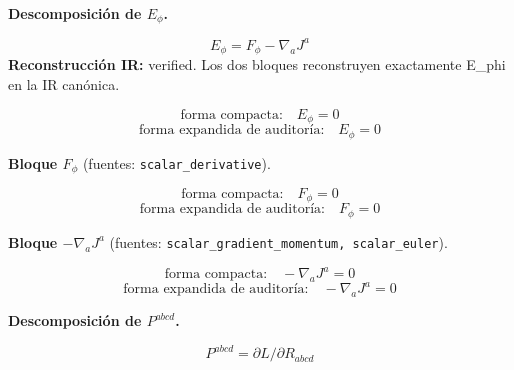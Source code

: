 \documentclass[11pt]{article}
\begin{document}
\par\medskip\noindent\textbf{Descomposición de $ E_{\phi} $.}\par
\begin{dmath*}[breakdepth={5}]
E_{\phi}=F_{\phi}-\nabla_aJ^a
\end{dmath*}
\textbf{Reconstrucción IR:} verified. Los dos bloques reconstruyen exactamente E\_phi en la IR canónica.\par
\begin{dmath*}[breakdepth={5}]
\text{forma compacta:}\quad E_{\phi} = 0
\end{dmath*}
\begin{dmath*}[breakdepth={5}]
\text{forma expandida de auditoría:}\quad E_{\phi} = 0
\end{dmath*}
\par\smallskip\noindent\textbf{Bloque $ F_{\phi} $} (fuentes: \texttt{scalar\_derivative}).\par
\begin{dmath*}[breakdepth={5}]
\text{forma compacta:}\quad F_{\phi} = 0
\end{dmath*}
\begin{dmath*}[breakdepth={5}]
\text{forma expandida de auditoría:}\quad F_{\phi} = 0
\end{dmath*}
\par\smallskip\noindent\textbf{Bloque $ -\nabla_a J^a $} (fuentes: \texttt{scalar\_gradient\_momentum, scalar\_euler}).\par
\begin{dmath*}[breakdepth={5}]
\text{forma compacta:}\quad -\nabla_a J^a = 0
\end{dmath*}
\begin{dmath*}[breakdepth={5}]
\text{forma expandida de auditoría:}\quad -\nabla_a J^a = 0
\end{dmath*}
\par\medskip\noindent\textbf{Descomposición de $ P^{abcd} $.}\par
\begin{dmath*}[breakdepth={5}]
P^{abcd}=\partial L/\partial R_{abcd}
\end{dmath*}
\end{document}
